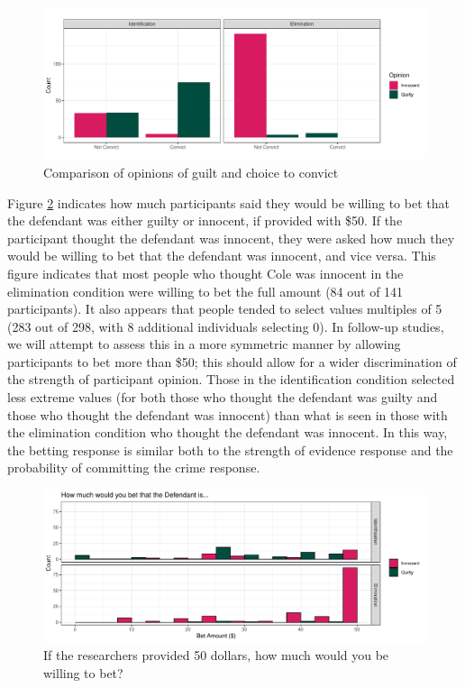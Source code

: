 \documentclass[print]{nuthesis}
\begin{document}
\begin{figure}

{\centering \includegraphics[width=\linewidth]{thesis_files/figure-latex/opinionguilt-1} 

}

\caption{Comparison of opinions of guilt and choice to convict}\label{fig:opinionguilt}
\end{figure}

Figure \ref{fig:betting} indicates how much participants said they would be willing to bet that the defendant was either guilty or innocent, if provided with \$50.
If the participant thought the defendant was innocent, they were asked how much they would be willing to bet that the defendant was innocent, and vice versa.
This figure indicates that most people who thought Cole was innocent in the elimination condition were willing to bet the full amount (84 out of 141 participants).
It also appears that people tended to select values multiples of 5 (283 out of 298, with 8 additional individuals selecting 0).
In follow-up studies, we will attempt to assess this in a more symmetric manner by allowing participants to bet more than \$50; this should allow for a wider discrimination of the strength of participant opinion.
Those in the identification condition selected less extreme values (for both those who thought the defendant was guilty and those who thought the defendant was innocent) than what is seen in those with the elimination condition who thought the defendant was innocent.
In this way, the betting response is similar both to the strength of evidence response and the probability of committing the crime response.

\begin{figure}

{\centering \includegraphics[width=\linewidth]{thesis_files/figure-latex/betting-1} 

}

\caption{If the researchers provided 50 dollars, how much would you be willing to bet?}\label{fig:betting}
\end{figure}
\end{document}
